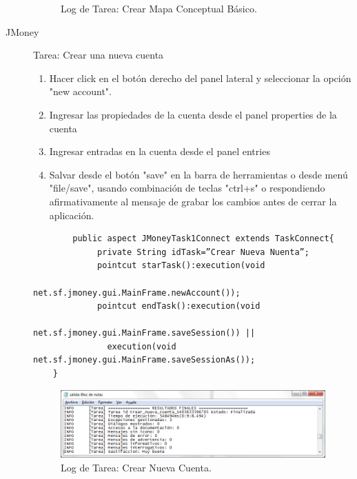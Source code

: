 \begin{description}
\begin{figure}[ht]
		\caption{\label{fig:fig4} Log de Tarea: Crear Mapa Conceptual Básico.}
	\end{figure}
\squeezeup
\item[JMoney]
Tarea: Crear una nueva cuenta
	\begin{enumerate}
		\item Hacer click en el botón derecho del panel lateral y seleccionar la opción "new account".
		\item Ingresar las propiedades de la cuenta desde el panel properties de la cuenta
		\item Ingresar entradas en la cuenta desde el panel entries  
		\item Salvar desde el botón "save" en la barra de herramientas o desde menú "file/save", usando combinación de teclas "ctrl+s" o respondiendo afirmativamente al mensaje de grabar los cambios antes de cerrar la aplicación.
	\end{enumerate}
	\squeezeup
	\begin{verbatim}
		public aspect JMoneyTask1Connect extends TaskConnect{		
		     private String idTask=”Crear Nueva Nuenta”;
		     pointcut starTask():execution(void   
		                  net.sf.jmoney.gui.MainFrame.newAccount());
		     pointcut endTask():execution(void                  
		               net.sf.jmoney.gui.MainFrame.saveSession()) || 
		       execution(void net.sf.jmoney.gui.MainFrame.saveSessionAs());
	}
	\end{verbatim}
	\squeezeup
	\squeezeup
	\begin{figure}[ht!]
		\centering
		\includegraphics[scale=0.4]{figs/fig5.png}
		\caption{\label{fig:fig5} Log de Tarea: Crear Nueva Cuenta.}
	\end{figure}
	\squeezeup
\end{description}